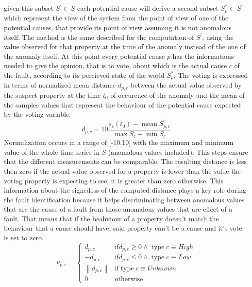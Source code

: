 given this subset $S^{'}\subset S$ each potential cause will derive a second subset $S^{''}_p\subset S^{'}$ which represent the view of the system from the point of view of one of the potential causes, that provide its point of view assuming it is not anomalous itself. The method is the same described for the computation of $S^{'}$, using the value observed for that property at the time of the anomaly instead of the one of the anomaly itself.
At this point every potential cause $p$ has the informations needed to give the opinion, that is to vote, about which is the actual cause $c$ of the fault, according to its percieved state of the world $S^{''}_p$. The voting is expressed in terms of normalized mean distance $d_{p,c}$ between the actual value observed by the suspect property at the time $t_0$ of occurence of the anomaly and the mean of the samples values that represent the behaviour of the potential cause expected by the voting variable.
\begin{equation}
  \label{eq:norm_mean_dist}
  d_{p,c}=10\frac{s_c(t_0)-\operatorname{mean}S^{''}_{p,c}}{\operatorname{max}S_c-\operatorname{min}S_c}
\end{equation}
Normalization occurs in a range of [-10,10] with the maximum and minimum value of the whole time series in $S$ (anomalous values included). This steps ensure that the different measurements can be comparable. %
The resulting distance is less then zero if the actual value observed for a property is lower than the value the voting property is expecting to see, it is greater than zero otherwise. This information about the signedess of the computed distance plays a key role during the fault identification because it helps discriminating between anomalous values that are the cause of a fault from those anomalous values that are effect of a fault. That means that if the beahviour of a property doesn't match the behaviour that a cause should have, said property can't be a cause and it's vote is set to zero.
\begin{equation}
  \label{eq:vote}
  v_{p,c}=\begin{cases}
    d_{p,c} & \text{if} d_{p,c}\geq 0 \land \operatorname{type}c\equiv High \\
    -d_{p,c} & \text{if} d_{p,c}\leq 0 \land \operatorname{type}c\equiv Low \\
    \left\lVert d_{p,c}\right\rVert & \text{if} \operatorname{type}c\equiv Unknown \\
    0 & \text{otherwise}
\end{cases}
\end{equation}
